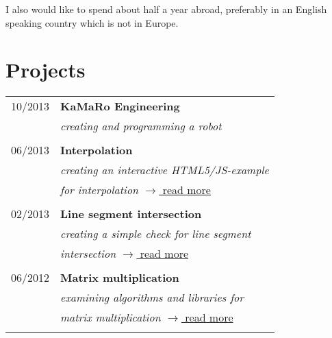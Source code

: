 \documentclass[a4paper,10pt]{article} %
\begin{document}
{\begin{minipage}[t]{0.5\textwidth}
I also would like to spend about half a year abroad, preferably
in an English speaking country which is not in Europe.



\end{minipage} %
\hfill
\begin{minipage}[t]{0.44\textwidth} 
\vspace{0pt} %


\section{Projects} 

\begin{tabular}{rl}
10/2013	 & \textbf{KaMaRo Engineering}\\
& \textit{creating and programming a robot}\\ \\

06/2013	 & \textbf{Interpolation}\\
& \textit{creating an interactive HTML5/JS-example}\\
& \textit{for interpolation} \hfill \href{http://martin-thoma.com/polynomial-interpolation/}{$\rightarrow$ read more} \\\\

02/2013	 & \textbf{Line segment intersection}\\
& \textit{creating a simple check for line segment}\\
& \textit{intersection} \hfill \href{http://martin-thoma.com/how-to-check-if-two-line-segments-intersect/}{$\rightarrow$ read more} \\\\

06/2012	 & \textbf{Matrix multiplication}\\
& \textit{examining algorithms and libraries for}\\
& \textit{matrix multiplication} \hfill \href{http://martin-thoma.com/matrix-multiplication-python-java-cpp/}{$\rightarrow$ read more}\\\\


\end{tabular}
\end{minipage}}
\end{document}
